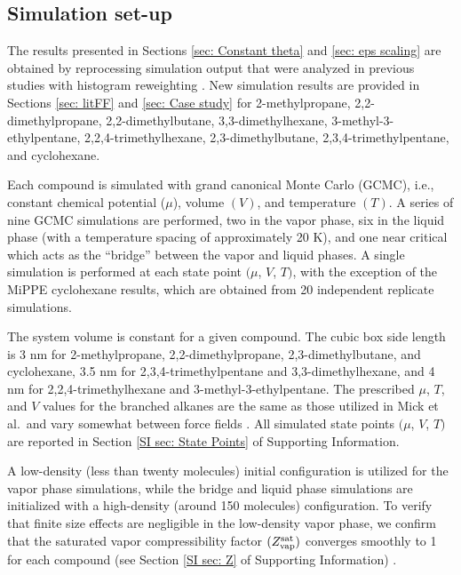 \documentclass[journal=jced,manuscript=article]{achemso}
\begin{document}
\subsection{Simulation set-up} \label{sec: Simulation set-up}

The results presented in Sections \ref{sec: Constant theta} and \ref{sec: eps scaling} are obtained by reprocessing simulation output that were analyzed in previous studies with histogram reweighting \cite{Potoff_branched,Barhaghi2017}. New simulation results are provided in Sections \ref{sec: litFF} and \ref{sec: Case study} for 2-methylpropane, 2,2-dimethylpropane, 2,2-dimethylbutane, 3,3-dimethylhexane, 3-methyl-3-ethylpentane, 2,2,4-trimethylhexane, 2,3-dimethylbutane, 2,3,4-trimethylpentane, and cyclohexane. 

Each compound is simulated with grand canonical Monte Carlo (GCMC), i.e., constant chemical potential ($\mu$), volume $(V)$, and temperature $(T)$. A series of nine GCMC simulations are performed, two in the vapor phase, six in the liquid phase (with a temperature spacing of approximately 20 K), and one near critical which acts as the ``bridge'' between the vapor and liquid phases. A single simulation is performed at each state point $(\mu$, $V$, $T)$, with the exception of the MiPPE cyclohexane results, which are obtained from 20 independent replicate simulations. 

The system volume is constant for a given compound. The cubic box side length is 3 nm for 2-methylpropane, 2,2-dimethylpropane, 2,3-dimethylbutane, and cyclohexane, 3.5 nm for 2,3,4-trimethylpentane and 3,3-dimethylhexane, and 4 nm for 2,2,4-trimethylhexane and 3-methyl-3-ethylpentane. The prescribed $\mu$, $T$, and $V$ values for the branched alkanes are the same as those utilized in Mick et al.~and vary somewhat between force fields \cite{Potoff_branched}. All simulated state points $(\mu$, $V$, $T)$ are reported in Section \ref{SI sec: State Points} of Supporting Information. 

A low-density (less than twenty molecules) initial configuration is utilized for the vapor phase simulations, while the bridge and liquid phase simulations are initialized with a high-density (around 150 molecules) configuration. To verify that finite size effects are negligible in the low-density vapor phase, we confirm that the saturated vapor compressibility factor $(Z^{\rm sat}_{\rm vap})$ converges smoothly to 1 for each compound (see Section \ref{SI sec: Z} of Supporting Information) \cite{Nezbeda2016}.
\end{document}
